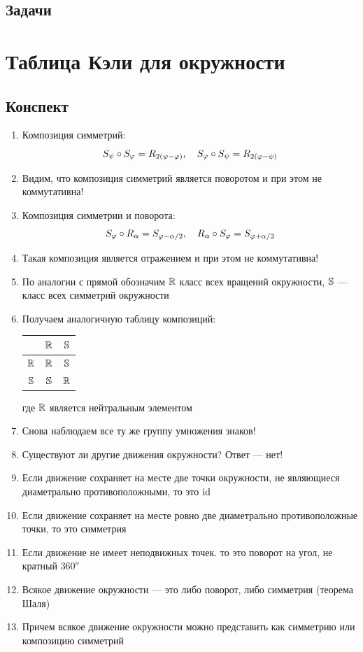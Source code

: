 \subsection{Задачи}



\section{Таблица Кэли для окружности}

\subsection{Конспект}
\begin{enumerate}\setlength{\itemsep}{1pt}
\item Композиция симметрий: 
$$
S_\psi\circ S_\ph=R_{2(\psi-\ph)},\quad S_\ph\circ S_\psi=R_{2(\ph-\psi)}
$$
\item Видим, что композиция симметрий является поворотом и при этом не коммутативна!
\item Композиция симметрии и поворота:
$$
S_\ph\circ R_\al = S_{\ph-\al/2},\quad R_\al\circ S_\ph = S_{\ph+\al/2}
$$
\item Такая композиция является отражением и при этом не коммутативна!
\item По аналогии с прямой обозначим $\R$ класс всех вращений окружности, $\S$ --- класс всех симметрий окружности
\item Получаем аналогичную таблицу композиций:
\begin{table}[htb!]\begin{center}
\begin{tabular}{c|c|c|}
  & $\R$ & $\S$ \\
 \hline
$\R$ & $\R$ & $\S$ \\
 \hline
$\S$ & $\S$ & $\R$ \\
\hline
\end{tabular}
\end{center}\end{table}

где $\R$ является нейтральным элементом
\item Снова наблюдаем все ту же группу умножения знаков!
\item Существуют ли другие движения окружности? Ответ --- нет!
\item Если движение сохраняет на месте две точки окружности, не являющиеся диаметрально противоположными, то это $\id$
\item Если движение сохраняет на месте ровно две диаметрально противоположные точки, то это симметрия
\item Если движение не имеет неподвижных точек. то это поворот на угол, не кратный $360^o$
\item Всякое движение окружности --- это либо поворот, либо симметрия (теорема Шаля)
\item Причем всякое движение окружности можно представить как симметрию или композицию симметрий
\end{enumerate}
